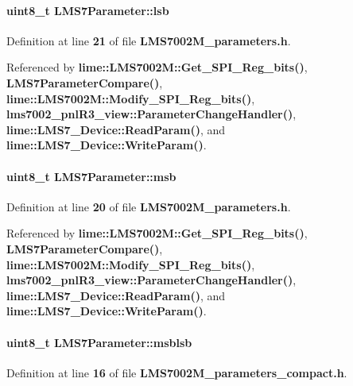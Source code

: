 \paragraph[{lsb}]{\setlength{\rightskip}{0pt plus 5cm}uint8\+\_\+t L\+M\+S7\+Parameter\+::lsb}\label{structLMS7Parameter_ad20fa63f2877942065f5704b404c81ca}


Definition at line {\bf 21} of file {\bf L\+M\+S7002\+M\+\_\+parameters.\+h}.



Referenced by {\bf lime\+::\+L\+M\+S7002\+M\+::\+Get\+\_\+\+S\+P\+I\+\_\+\+Reg\+\_\+bits()}, {\bf L\+M\+S7\+Parameter\+Compare()}, {\bf lime\+::\+L\+M\+S7002\+M\+::\+Modify\+\_\+\+S\+P\+I\+\_\+\+Reg\+\_\+bits()}, {\bf lms7002\+\_\+pnl\+R3\+\_\+view\+::\+Parameter\+Change\+Handler()}, {\bf lime\+::\+L\+M\+S7\+\_\+\+Device\+::\+Read\+Param()}, and {\bf lime\+::\+L\+M\+S7\+\_\+\+Device\+::\+Write\+Param()}.

\paragraph[{msb}]{\setlength{\rightskip}{0pt plus 5cm}uint8\+\_\+t L\+M\+S7\+Parameter\+::msb}\label{structLMS7Parameter_aea9f8ad96e6171f52c9dfc4a654b6382}


Definition at line {\bf 20} of file {\bf L\+M\+S7002\+M\+\_\+parameters.\+h}.



Referenced by {\bf lime\+::\+L\+M\+S7002\+M\+::\+Get\+\_\+\+S\+P\+I\+\_\+\+Reg\+\_\+bits()}, {\bf L\+M\+S7\+Parameter\+Compare()}, {\bf lime\+::\+L\+M\+S7002\+M\+::\+Modify\+\_\+\+S\+P\+I\+\_\+\+Reg\+\_\+bits()}, {\bf lms7002\+\_\+pnl\+R3\+\_\+view\+::\+Parameter\+Change\+Handler()}, {\bf lime\+::\+L\+M\+S7\+\_\+\+Device\+::\+Read\+Param()}, and {\bf lime\+::\+L\+M\+S7\+\_\+\+Device\+::\+Write\+Param()}.

\paragraph[{msblsb}]{\setlength{\rightskip}{0pt plus 5cm}uint8\+\_\+t L\+M\+S7\+Parameter\+::msblsb}\label{structLMS7Parameter_a80f6777ce97dc48b85a5d61b5498bbf9}


Definition at line {\bf 16} of file {\bf L\+M\+S7002\+M\+\_\+parameters\+\_\+compact.\+h}.



